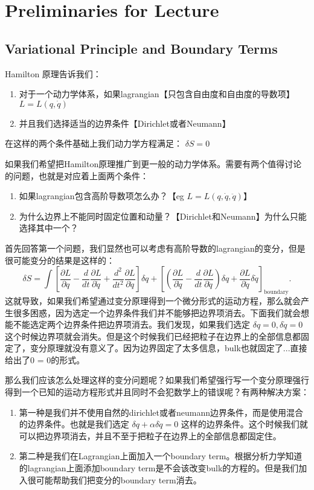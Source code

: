 \section{Preliminaries for Lecture}\label{sec:Preliminaries for Lecture} %
\subsection{Variational Principle and Boundary Terms}
Hamilton 原理告诉我们：
\begin{enumerate}
  \item 对于一个动力学体系，如果lagrangian【只包含自由度和自由度的导数项】 $ L = L(q,\dot{q}) $
  \item 并且我们选择适当的边界条件【Dirichlet或者Neumann】
\end{enumerate}
在这样的两个条件基础上我们动力学方程满足： $ \delta S = 0 $

如果我们希望把Hamilton原理推广到更一般的动力学体系。需要有两个值得讨论的问题，也就是对应着上面两个条件：
\begin{enumerate}
  \item 如果lagrangian包含高阶导数项怎么办？【eg $ L = L(q,\dot{q},\ddot{q}) $】
  \item 为什么边界上不能同时固定位置和动量？【Dirichlet和Neumann】为什么只能选择其中一个？
\end{enumerate}
首先回答第一个问题，我们显然也可以考虑有高阶导数的lagrangian的变分，但是很可能变分的结果是这样的：
\begin{equation}
  \delta S=\int\left[\frac{\partial L}{\partial q}-\frac{d}{dt}\frac{\partial L}{\partial\dot{q}}+\frac{d^{2}}{dt^{2}}\frac{\partial L}{\partial\ddot{q}}\right]\delta q+\left[\left(\frac{\partial L}{\partial\dot{q}}-\frac{d}{dt}\frac{\partial L}{\partial\ddot{q}}\right)\delta q+\frac{\partial L}{\partial\ddot{q}}\delta\dot{q}\right]_{\mathrm{boundary}}.
  \label{eq:morederivativevariation}
\end{equation}
这就导致，如果我们希望通过变分原理得到一个微分形式的运动方程，那么就会产生很多困惑，因为选定一个边界条件我们并不能够把边界项消去。下面我们就会想能不能选定两个边界条件把边界项消去。我们发现，如果我们选定 $ \delta q = 0, \delta \dot{q} = 0 $ 这个时候边界项就会消失。但是这个时候我们已经把粒子在边界上的全部信息都固定了，变分原理就没有意义了。因为边界固定了太多信息，bulk也就固定了...直接给出了0 = 0的形式。


那么我们应该怎么处理这样的变分问题呢？如果我们希望强行写一个变分原理强行得到一个已知的运动方程形式并且同时不会犯数学上的错误呢？有两种解决方案：
\begin{enumerate}
  \item 第一种是我们并不使用自然的dirichlet或者neumann边界条件，而是使用混合的边界条件。也就是我们选定 $ \delta q + \alpha \delta \dot{q} = 0 $ 这样的边界条件。这个时候我们就可以把边界项消去，并且不至于把粒子在边界上的全部信息都固定住。
  \item 第二种是我们在Lagrangian上面加入一个boundary term。根据分析力学知道的lagrangian上面添加boundary term是不会该改变bulk的方程的。但是我们加入很可能帮助我们把变分的boundary term消去。
\end{enumerate}


